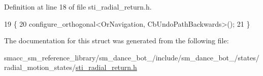 Definition at line 18 of file sti\+\_\+radial\+\_\+return.\+h.


\begin{DoxyCode}
19   \{
20     configure\_orthogonal<OrNavigation, CbUndoPathBackwards>();
21   \}
\end{DoxyCode}


The documentation for this struct was generated from the following file\+:\begin{DoxyCompactItemize}
\item 
smacc\+\_\+sm\+\_\+reference\+\_\+library/sm\+\_\+dance\+\_\+bot\+\_/include/sm\+\_\+dance\+\_\+bot\+\_/states/radial\+\_\+motion\+\_\+states/\hyperlink{2_2include_2sm__dance__bot__2_2states_2radial__motion__states_2sti__radial__return_8h}{sti\+\_\+radial\+\_\+return.\+h}\end{DoxyCompactItemize}
